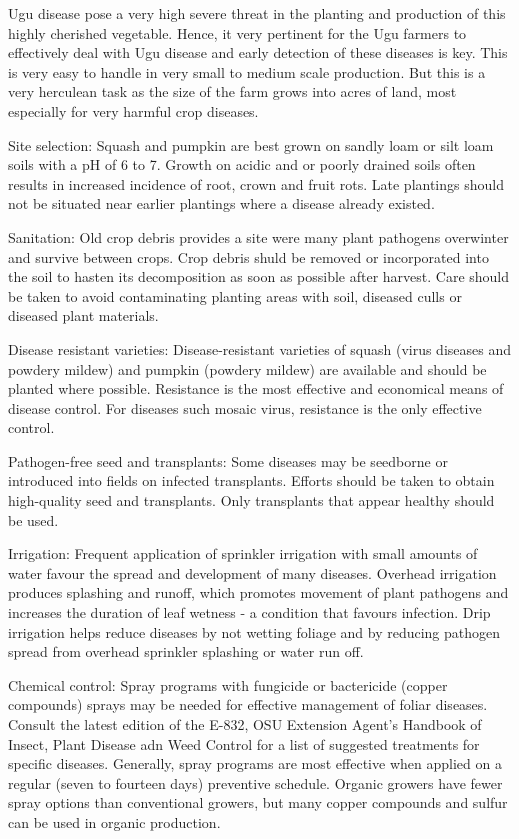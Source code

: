 Ugu disease pose a very high severe threat in the planting and production of this highly cherished vegetable. Hence, it very pertinent for the Ugu farmers to effectively deal with Ugu disease and early detection of these diseases is key. This is very easy to handle in very small to medium scale production. But this is a very herculean task as the size of the farm grows into acres of land, most especially for very harmful crop diseases.

Site selection: Squash and pumpkin are best grown on sandly loam or silt loam soils with a pH of 6 to 7. Growth on acidic and or poorly drained soils often results in increased incidence of root, crown and fruit rots. Late plantings should not be situated near earlier plantings  where a disease already existed. \citep{johnPumpkinSquashDiseases2019a}

Sanitation: Old crop debris provides a site were many plant pathogens overwinter and survive between crops. Crop debris shuld be removed or incorporated into the soil to hasten its decomposition as soon as possible after harvest. Care should be taken to avoid contaminating planting areas with soil, diseased culls or diseased plant materials. \citep{johnPumpkinSquashDiseases2019a}

Disease resistant varieties: Disease-resistant varieties of squash (virus  diseases and powdery mildew) and pumpkin (powdery mildew) are available and should be planted where possible. Resistance is the most effective and economical means of disease control. For diseases such mosaic virus, resistance is the only effective control. \citep{johnPumpkinSquashDiseases2019a}

Pathogen-free seed and transplants: Some diseases may be seedborne or introduced into fields on infected transplants. Efforts should be taken to obtain high-quality seed and transplants. Only transplants that appear healthy should be used.\citep{johnPumpkinSquashDiseases2019a}

Irrigation: Frequent application of sprinkler irrigation with small amounts of water favour the spread and development of many diseases. Overhead irrigation produces splashing and runoff, which promotes movement of plant pathogens and increases the duration of leaf wetness - a condition that favours infection. Drip irrigation helps reduce diseases by not wetting foliage and by reducing pathogen spread from overhead sprinkler splashing or water run off. \citep{johnPumpkinSquashDiseases2019a}

Chemical control: Spray programs with fungicide or bactericide (copper compounds) sprays may be needed for effective management of foliar diseases. Consult the latest edition of the E-832, OSU Extension Agent's Handbook of Insect, Plant Disease adn Weed Control for a list of suggested treatments for specific diseases. Generally, spray programs are most effective when applied on a regular (seven to fourteen days) preventive schedule. Organic growers have fewer spray options than conventional growers, but many copper compounds and sulfur can be used in organic production.\citep{johnPumpkinSquashDiseases2019a}

